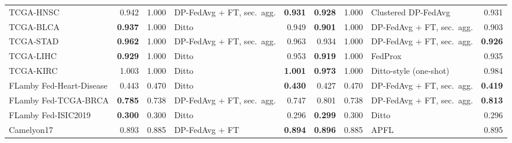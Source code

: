 \begin{tabular}{lrrlrrrlr}
TCGA-HNSC & 0.942 & 1.000 & DP-FedAvg + FT, sec.\ agg. \cite{mcmahan2018learning,bonawitz2017practical} & \textbf{0.931} & \textbf{0.928} & 1.000 & Clustered DP-FedAvg \cite{ghosh2020efficient,mcmahan2018learning} & 0.931 \\
TCGA-BLCA & \textbf{0.937} & 1.000 & Ditto \cite{li2021ditto} & 0.949 & \textbf{0.901} & 1.000 & DP-FedAvg + FT, sec.\ agg. \cite{mcmahan2018learning,bonawitz2017practical} & 0.903 \\
TCGA-STAD & \textbf{0.962} & 1.000 & DP-FedAvg + FT, sec.\ agg. \cite{mcmahan2018learning,bonawitz2017practical} & 0.963 & 0.934 & 1.000 & DP-FedAvg + FT, sec.\ agg. \cite{mcmahan2018learning,bonawitz2017practical} & \textbf{0.926} \\
TCGA-LIHC & \textbf{0.929} & 1.000 & Ditto \cite{li2021ditto} & 0.953 & \textbf{0.919} & 1.000 & FedProx \cite{li2020federated} & 0.935 \\
TCGA-KIRC & 1.003 & 1.000 & Ditto \cite{li2021ditto} & \textbf{1.001} & \textbf{0.973} & 1.000 & Ditto-style (one-shot) \cite{li2021ditto} & 0.984 \\
FLamby Fed-Heart-Disease & 0.443 & 0.470 & Ditto \cite{li2021ditto} & \textbf{0.430} & 0.427 & 0.470 & DP-FedAvg + FT, sec.\ agg. \cite{mcmahan2018learning,bonawitz2017practical} & \textbf{0.419} \\
FLamby Fed-TCGA-BRCA & \textbf{0.785} & 0.738 & DP-FedAvg + FT, sec.\ agg. \cite{mcmahan2018learning,bonawitz2017practical} & 0.747 & 0.801 & 0.738 & DP-FedAvg + FT, sec.\ agg. \cite{mcmahan2018learning,bonawitz2017practical} & \textbf{0.813} \\
FLamby Fed-ISIC2019 & \textbf{0.300} & 0.300 & Ditto \cite{li2021ditto} & 0.296 & \textbf{0.299} & 0.300 & Ditto \cite{li2021ditto} & 0.296 \\
Camelyon17 & 0.893 & 0.885 & DP-FedAvg + FT \cite{mcmahan2018learning} & \textbf{0.894} & \textbf{0.896} & 0.885 & APFL \cite{deng2020adaptive} & 0.895 \\
\bottomrule
\end{tabular}
